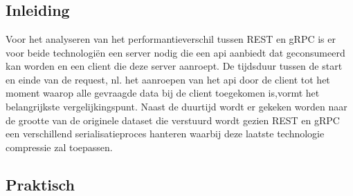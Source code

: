 
\chapter{}%
\label{ch:methodologie}


\section{Inleiding}

Voor het analyseren van het performantieverschil tussen REST en gRPC is er voor beide technologiën een server nodig die een api aanbiedt dat geconsumeerd kan worden en
een client die deze server aanroept. De tijdsduur tussen de start en einde van de request, nl. het aanroepen van het api door de client
tot het moment waarop alle gevraagde data bij de client toegekomen is,vormt het belangrijkste vergelijkingspunt.
Naast de duurtijd wordt er gekeken worden naar de grootte van de originele dataset die verstuurd wordt gezien REST en gRPC
een verschillend serialisatieproces hanteren waarbij deze laatste technologie compressie zal toepassen.

\section{Praktisch}

